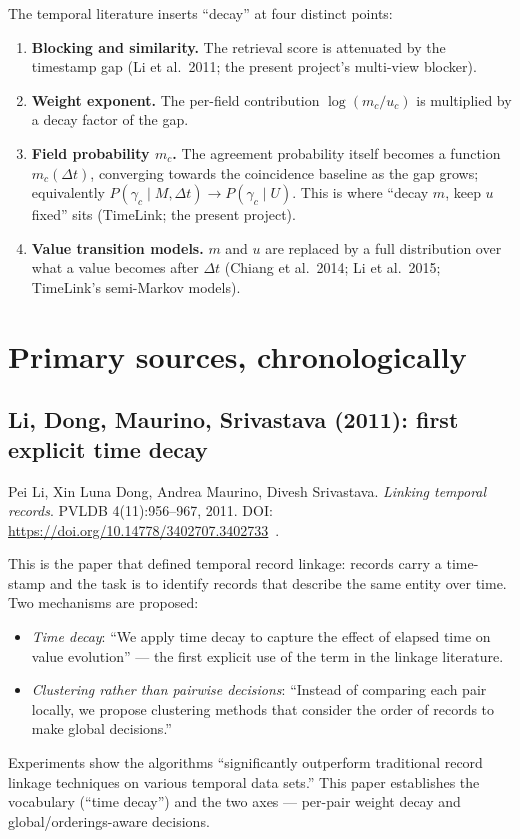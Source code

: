 \documentclass[11pt]{article}
\newcommand{\dt}{\Delta t}
\begin{document}
The temporal literature inserts ``decay'' at four distinct points:
\begin{enumerate}[leftmargin=*]
  \item \textbf{Blocking and similarity.} The retrieval score is attenuated by the
        timestamp gap (Li et al.\ 2011; the present project's
        multi-view blocker).
  \item \textbf{Weight exponent.} The per-field contribution $\log(m_c/u_c)$ is multiplied
        by a decay factor of the gap.
  \item \textbf{Field probability $m_c$.} The agreement probability itself becomes a
        function $m_c(\dt)$, converging towards the coincidence baseline as the gap grows;
        equivalently $P(\gamma_c\mid M,\dt)\to P(\gamma_c\mid U)$. This is where
        ``decay $m$, keep $u$ fixed'' sits (TimeLink; the present project).
  \item \textbf{Value transition models.} $m$ and $u$ are replaced by a full distribution
        over what a value becomes after $\dt$ (Chiang et al.\ 2014; Li et al.\ 2015;
        TimeLink's semi-Markov models).
\end{enumerate}

\section{Primary sources, chronologically}

\subsection{Li, Dong, Maurino, Srivastava (2011): first explicit time decay}

Pei Li, Xin Luna Dong, Andrea Maurino, Divesh Srivastava.
\emph{Linking temporal records}. PVLDB 4(11):956--967, 2011.
DOI: \url{https://doi.org/10.14778/3402707.3402733}~\cite{li2011}.

This is the paper that defined temporal record linkage: records carry a time-stamp and the
task is to identify records that describe the same entity over time. Two mechanisms are
proposed:
\begin{itemize}[leftmargin=*]
  \item \emph{Time decay}: ``We apply time decay to capture the effect of elapsed time on
        value evolution'' --- the first explicit use of the term in the linkage
        literature.
  \item \emph{Clustering rather than pairwise decisions}: ``Instead of comparing each pair
        locally, we propose clustering methods that consider the order of records to make
        global decisions.''
\end{itemize}
Experiments show the algorithms ``significantly outperform traditional record linkage
techniques on various temporal data sets.'' This paper establishes the vocabulary
(``time decay'') and the two axes --- per-pair weight decay and global/orderings-aware
decisions.
\end{document}
